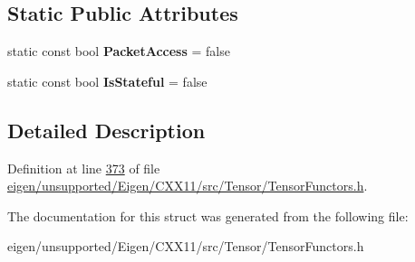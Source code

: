 \subsection*{Static Public Attributes}
\begin{DoxyCompactItemize}
\item 
\mbox{\label{struct_eigen_1_1internal_1_1_or_reducer_a99e5a9aa342feab41d3493c43ea1a57b}} 
static const bool {\bfseries Packet\+Access} = false
\item 
\mbox{\label{struct_eigen_1_1internal_1_1_or_reducer_aad8fd780aa84525c2a3f898579d3a641}} 
static const bool {\bfseries Is\+Stateful} = false
\end{DoxyCompactItemize}


\subsection{Detailed Description}


Definition at line \hyperlink{eigen_2unsupported_2_eigen_2_c_x_x11_2src_2_tensor_2_tensor_functors_8h_source_l00373}{373} of file \hyperlink{eigen_2unsupported_2_eigen_2_c_x_x11_2src_2_tensor_2_tensor_functors_8h_source}{eigen/unsupported/\+Eigen/\+C\+X\+X11/src/\+Tensor/\+Tensor\+Functors.\+h}.



The documentation for this struct was generated from the following file\+:\begin{DoxyCompactItemize}
\item 
eigen/unsupported/\+Eigen/\+C\+X\+X11/src/\+Tensor/\+Tensor\+Functors.\+h\end{DoxyCompactItemize}
